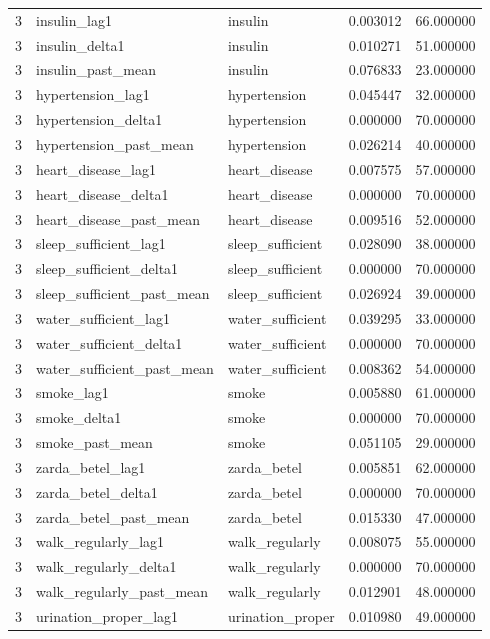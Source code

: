 \begin{longtable}{rllrr}
3 & insulin\_lag1 & insulin & 0.003012 & 66.000000 \\
3 & insulin\_delta1 & insulin & 0.010271 & 51.000000 \\
3 & insulin\_past\_mean & insulin & 0.076833 & 23.000000 \\
3 & hypertension\_lag1 & hypertension & 0.045447 & 32.000000 \\
3 & hypertension\_delta1 & hypertension & 0.000000 & 70.000000 \\
3 & hypertension\_past\_mean & hypertension & 0.026214 & 40.000000 \\
3 & heart\_disease\_lag1 & heart\_disease & 0.007575 & 57.000000 \\
3 & heart\_disease\_delta1 & heart\_disease & 0.000000 & 70.000000 \\
3 & heart\_disease\_past\_mean & heart\_disease & 0.009516 & 52.000000 \\
3 & sleep\_sufficient\_lag1 & sleep\_sufficient & 0.028090 & 38.000000 \\
3 & sleep\_sufficient\_delta1 & sleep\_sufficient & 0.000000 & 70.000000 \\
3 & sleep\_sufficient\_past\_mean & sleep\_sufficient & 0.026924 & 39.000000 \\
3 & water\_sufficient\_lag1 & water\_sufficient & 0.039295 & 33.000000 \\
3 & water\_sufficient\_delta1 & water\_sufficient & 0.000000 & 70.000000 \\
3 & water\_sufficient\_past\_mean & water\_sufficient & 0.008362 & 54.000000 \\
3 & smoke\_lag1 & smoke & 0.005880 & 61.000000 \\
3 & smoke\_delta1 & smoke & 0.000000 & 70.000000 \\
3 & smoke\_past\_mean & smoke & 0.051105 & 29.000000 \\
3 & zarda\_betel\_lag1 & zarda\_betel & 0.005851 & 62.000000 \\
3 & zarda\_betel\_delta1 & zarda\_betel & 0.000000 & 70.000000 \\
3 & zarda\_betel\_past\_mean & zarda\_betel & 0.015330 & 47.000000 \\
3 & walk\_regularly\_lag1 & walk\_regularly & 0.008075 & 55.000000 \\
3 & walk\_regularly\_delta1 & walk\_regularly & 0.000000 & 70.000000 \\
3 & walk\_regularly\_past\_mean & walk\_regularly & 0.012901 & 48.000000 \\
3 & urination\_proper\_lag1 & urination\_proper & 0.010980 & 49.000000 \\

\end{longtable}
